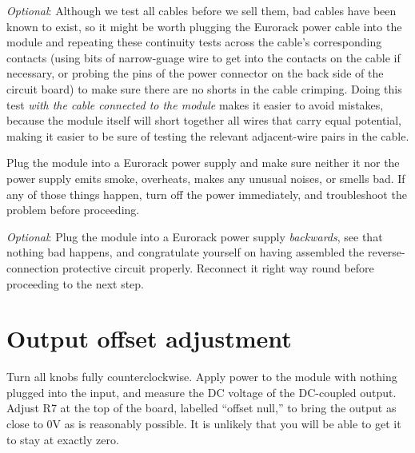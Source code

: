 \emph{Optional}:  Although we test all cables before we sell them, bad
cables have been known to exist, so it might be worth plugging the Eurorack
power cable into the module and repeating these continuity tests across the
cable's corresponding contacts (using bits of narrow-guage wire to get into
the contacts on the cable if necessary, or probing the pins of the power
connector on the back side of the circuit board) to make sure there are no
shorts in the cable crimping.  Doing this test \emph{with the cable
connected to the module} makes it easier to avoid mistakes, because the
module itself will short together all wires that carry equal potential,
making it easier to be sure of testing the relevant adjacent-wire pairs in
the cable.

Plug the module into a Eurorack power supply and make sure
neither it nor the power supply emits smoke, overheats, makes any unusual
noises, or smells bad.  If any of those things happen, turn off the power
immediately, and troubleshoot the problem before proceeding.

\emph{Optional}: Plug the module into a Eurorack power supply
\emph{backwards}, see that nothing bad happens, and congratulate yourself on
having assembled the reverse-connection protective circuit properly. 
Reconnect it right way round before proceeding to the next step.

\section{Output offset adjustment}

Turn all knobs fully counterclockwise.  Apply power to the module with
nothing plugged into the input, and measure the DC voltage of the DC-coupled
output.  Adjust R7 at the top of the board, labelled ``offset null,'' to
bring the output as close to 0V as is reasonably possible.  It is unlikely
that you will be able to get it to stay at exactly zero.
